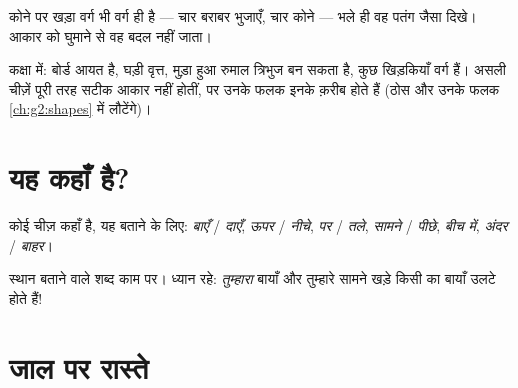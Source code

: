\begin{example}[तिरछा आकार भी वही आकार है]\label{ex:g1:shapes:tilted}
कोने पर खड़ा वर्ग भी वर्ग ही है --- चार बराबर भुजाएँ, चार
कोने --- भले ही वह पतंग जैसा दिखे। आकार को घुमाने से वह बदल
नहीं जाता।
\end{example}

\begin{example}[आकारों की खोज]\label{ex:g1:shapes:hunt}
कक्षा में: बोर्ड आयत है, घड़ी वृत्त, मुड़ा हुआ रुमाल त्रिभुज बन
सकता है, कुछ खिड़कियाँ वर्ग हैं। असली चीज़ें पूरी तरह सटीक आकार
नहीं होतीं, पर उनके फलक इनके क़रीब होते हैं (ठोस और उनके फलक
\cref{ch:g2:shapes} में लौटेंगे)।
\end{example}

\section{यह कहाँ है?}

\begin{definition}[स्थान बताने वाले शब्द]\label{def:g1:shapes:position}
कोई चीज़ कहाँ है, यह बताने के लिए: \emph{बाएँ} / \emph{दाएँ},
\emph{ऊपर} / \emph{नीचे}, \emph{पर} / \emph{तले},
\emph{सामने} / \emph{पीछे}, \emph{बीच में},
\emph{अंदर} / \emph{बाहर}।
\end{definition}

\begin{omfigure}

{\small स्थान बताने वाले शब्द काम पर। ध्यान रहे: \emph{तुम्हारा}
बायाँ और तुम्हारे सामने खड़े किसी का बायाँ उलटे होते हैं!}
\end{omfigure}

\section{जाल पर रास्ते}

